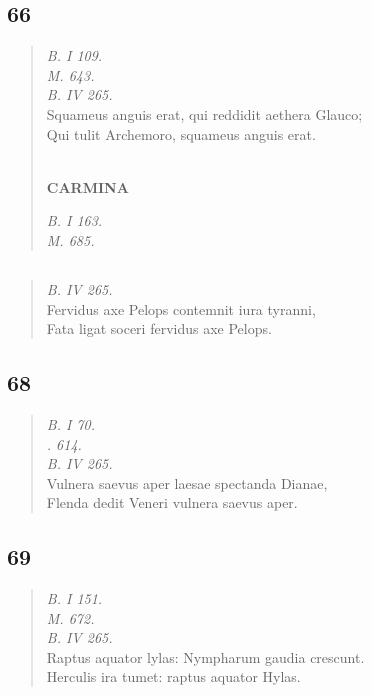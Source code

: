 \documentclass[11pt, a4paper]{report}
\begin{document}
            \subsection*{66}
      \begin{verse}
      \textit{B. I 109.} \\ \textit{M. 643.} \\ \textit{B. IV 265.} \\ Squameus anguis erat, qui reddidit aethera Glauco; \\ Qui tulit Archemoro, squameus anguis erat. \\ 
        ﻿\pagebreak 
     \marginpar{[108]} \begin{center} \textbf{CARMINA} \end{center}\textit{B. I 163.} \\ \textit{M. 685.} \\ 
      \end{verse}
  
            \subsection*{}
      \begin{verse}
      \textit{B. IV 265.} \\ Fervidus axe Pelops contemnit iura tyranni, \\ Fata ligat soceri fervidus axe Pelops. \\ 
      \end{verse}
  
            \subsection*{68}
      \begin{verse}
      \textit{B. I 70.} \\ \textit{. 614.} \\ \textit{B. IV 265.} \\ Vulnera saevus aper laesae spectanda Dianae, \\ Flenda dedit Veneri vulnera saevus aper. \\ 
      \end{verse}
  
            \subsection*{69}
      \begin{verse}
      \textit{B. I 151.} \\ \textit{M. 672.} \\ \textit{B. IV 265.} \\ Raptus aquator lylas: Nympharum gaudia crescunt. \\ Herculis ira tumet: raptus aquator Hylas. \\ 
      \end{verse}
  
\end{document}

